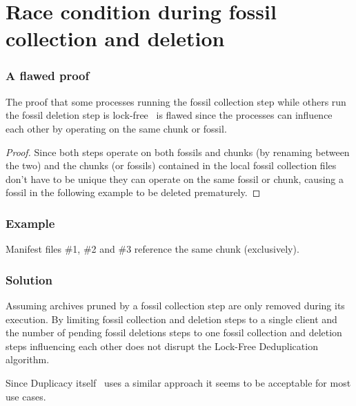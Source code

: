 \documentclass[english,utf8,aspectratio=169]{beamer}
\begin{document}
    \section{Race condition during fossil collection and deletion}
    \begin{frame}
        \frametitle{A flawed proof}
        \begin{theorem}
            The proof that some processes running the fossil collection step while others run the
            fossil deletion step is lock-free~\cite[Theorem 1, Case 3]{Duplicacy} is flawed since
            the processes can influence each other by operating on the same chunk or fossil.
        \end{theorem}
        \begin{proof}
            Since both steps operate on both fossils and chunks (by renaming between the two) and
            the chunks (or fossils) contained in the local fossil collection files don't have to be
            unique they can operate on the same fossil or chunk, causing a fossil in the following
            example to be deleted prematurely.
        \end{proof}
    \end{frame}

    \begin{frame}
        \frametitle{Example}
        Manifest files \#1, \#2 and \#3 reference the same chunk (exclusively).
        \begin{center}
            
        \end{center}
    \end{frame}

    \begin{frame}
        \frametitle{Solution}
        \begin{theorem}
            \label{theorem:singleclient}
            Assuming archives pruned by a fossil collection step are only removed during its execution.
            By limiting fossil collection and deletion steps to a single client and the number of
            pending fossil deletions steps to one fossil collection and deletion steps influencing
            each other does not disrupt the Lock-Free Deduplication algorithm.
        \end{theorem}
        Since Duplicacy itself~\cite[prune]{Duplicacy-Wiki} uses a similar approach it seems to be
        acceptable for most use cases.
    \end{frame}
\end{document}
